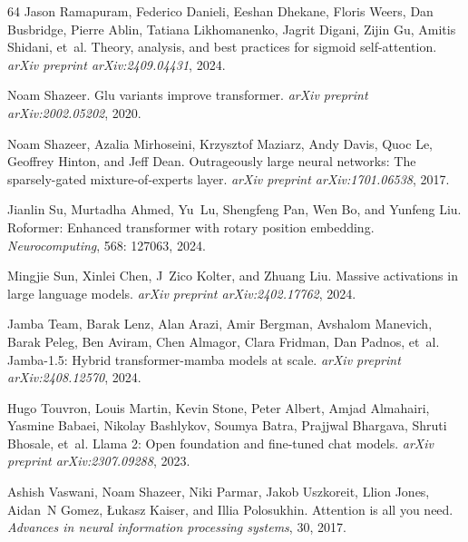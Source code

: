 \documentclass{article} \usepackage{iclr2025_conference,times}
\begin{document}
\begin{thebibliography}{64}
Jason Ramapuram, Federico Danieli, Eeshan Dhekane, Floris Weers, Dan Busbridge, Pierre Ablin, Tatiana Likhomanenko, Jagrit Digani, Zijin Gu, Amitis Shidani, et~al.
\newblock Theory, analysis, and best practices for sigmoid self-attention.
\newblock \emph{arXiv preprint arXiv:2409.04431}, 2024.

Noam Shazeer.
\newblock Glu variants improve transformer.
\newblock \emph{arXiv preprint arXiv:2002.05202}, 2020.

Noam Shazeer, Azalia Mirhoseini, Krzysztof Maziarz, Andy Davis, Quoc Le, Geoffrey Hinton, and Jeff Dean.
\newblock Outrageously large neural networks: The sparsely-gated mixture-of-experts layer.
\newblock \emph{arXiv preprint arXiv:1701.06538}, 2017.

Jianlin Su, Murtadha Ahmed, Yu~Lu, Shengfeng Pan, Wen Bo, and Yunfeng Liu.
\newblock Roformer: Enhanced transformer with rotary position embedding.
\newblock \emph{Neurocomputing}, 568: 127063, 2024.

Mingjie Sun, Xinlei Chen, J~Zico Kolter, and Zhuang Liu.
\newblock Massive activations in large language models.
\newblock \emph{arXiv preprint arXiv:2402.17762}, 2024.

Jamba Team, Barak Lenz, Alan Arazi, Amir Bergman, Avshalom Manevich, Barak Peleg, Ben Aviram, Chen Almagor, Clara Fridman, Dan Padnos, et~al.
\newblock Jamba-1.5: Hybrid transformer-mamba models at scale.
\newblock \emph{arXiv preprint arXiv:2408.12570}, 2024.

Hugo Touvron, Louis Martin, Kevin Stone, Peter Albert, Amjad Almahairi, Yasmine Babaei, Nikolay Bashlykov, Soumya Batra, Prajjwal Bhargava, Shruti Bhosale, et~al.
\newblock Llama 2: Open foundation and fine-tuned chat models.
\newblock \emph{arXiv preprint arXiv:2307.09288}, 2023.

Ashish Vaswani, Noam Shazeer, Niki Parmar, Jakob Uszkoreit, Llion Jones, Aidan~N Gomez, {\L}ukasz Kaiser, and Illia Polosukhin.
\newblock Attention is all you need.
\newblock \emph{Advances in neural information processing systems}, 30, 2017.


\end{thebibliography}
\end{document}
